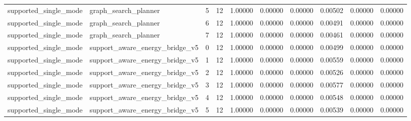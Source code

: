 \documentclass{article}
\begin{document}
\begin{table}[tbp]
{\begin{tabular}{llllllllll}
supported\_single\_mode & graph\_search\_planner & 5 & 12 & 1.00000 & 0.00000 & 0.00000 & 0.00502 & 0.00000 & 0.00000 \\
supported\_single\_mode & graph\_search\_planner & 6 & 12 & 1.00000 & 0.00000 & 0.00000 & 0.00491 & 0.00000 & 0.00000 \\
supported\_single\_mode & graph\_search\_planner & 7 & 12 & 1.00000 & 0.00000 & 0.00000 & 0.00461 & 0.00000 & 0.00000 \\
supported\_single\_mode & support\_aware\_energy\_bridge\_v5 & 0 & 12 & 1.00000 & 0.00000 & 0.00000 & 0.00499 & 0.00000 & 0.00000 \\
supported\_single\_mode & support\_aware\_energy\_bridge\_v5 & 1 & 12 & 1.00000 & 0.00000 & 0.00000 & 0.00559 & 0.00000 & 0.00000 \\
supported\_single\_mode & support\_aware\_energy\_bridge\_v5 & 2 & 12 & 1.00000 & 0.00000 & 0.00000 & 0.00526 & 0.00000 & 0.00000 \\
supported\_single\_mode & support\_aware\_energy\_bridge\_v5 & 3 & 12 & 1.00000 & 0.00000 & 0.00000 & 0.00577 & 0.00000 & 0.00000 \\
supported\_single\_mode & support\_aware\_energy\_bridge\_v5 & 4 & 12 & 1.00000 & 0.00000 & 0.00000 & 0.00548 & 0.00000 & 0.00000 \\
supported\_single\_mode & support\_aware\_energy\_bridge\_v5 & 5 & 12 & 1.00000 & 0.00000 & 0.00000 & 0.00539 & 0.00000 & 0.00000 \\
\bottomrule
\end{tabular}
}
\end{table}

\clearpage
\end{document}
